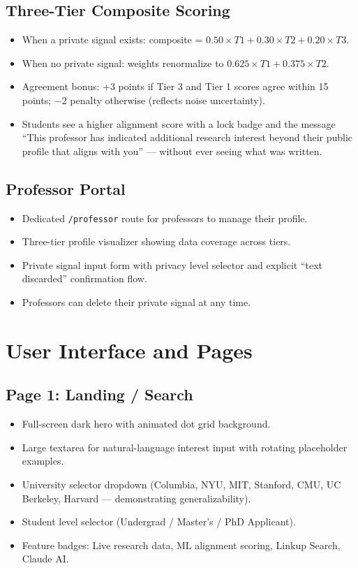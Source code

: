 \documentclass{article}
\begin{document}
\subsection{Three-Tier Composite Scoring}
\begin{itemize}
  \item When a private signal exists: composite = $0.50 \times T1 + 0.30 \times T2
        + 0.20 \times T3$.
  \item When no private signal: weights renormalize to $0.625 \times T1 +
        0.375 \times T2$.
  \item Agreement bonus: +3 points if Tier 3 and Tier 1 scores agree within 15 points;
        $-2$ penalty otherwise (reflects noise uncertainty).
  \item Students see a higher alignment score with a lock badge and the message
        ``This professor has indicated additional research interest beyond their
        public profile that aligns with you'' — without ever seeing what was written.
\end{itemize}

\subsection{Professor Portal}
\begin{itemize}
  \item Dedicated \texttt{/professor} route for professors to manage their profile.
  \item Three-tier profile visualizer showing data coverage across tiers.
  \item Private signal input form with privacy level selector and explicit
        ``text discarded'' confirmation flow.
  \item Professors can delete their private signal at any time.
\end{itemize}

\section{User Interface and Pages}

\subsection{Page 1: Landing / Search}
\begin{itemize}
  \item Full-screen dark hero with animated dot grid background.
  \item Large textarea for natural-language interest input with rotating
        placeholder examples.
  \item University selector dropdown (Columbia, NYU, MIT, Stanford, CMU,
        UC Berkeley, Harvard — demonstrating generalizability).
  \item Student level selector (Undergrad / Master's / PhD Applicant).
  \item Feature badges: Live research data, ML alignment scoring, Linkup Search,
        Claude AI.
\end{itemize}
\end{document}
